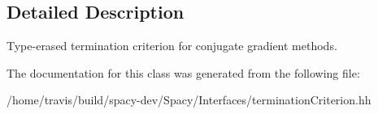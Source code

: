 \subsection{Detailed Description}
Type-\/erased termination criterion for conjugate gradient methods. 

The documentation for this class was generated from the following file\-:\begin{DoxyCompactItemize}
\item 
/home/travis/build/spacy-\/dev/\-Spacy/\-Interfaces/termination\-Criterion.\-hh\end{DoxyCompactItemize}
